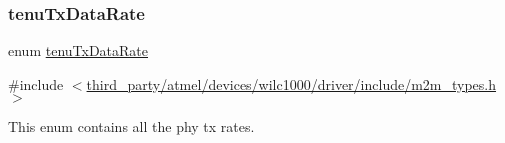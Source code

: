 \mbox{\label{group__WlanEnums_ga93cc7cca5e41a62c610de1e30ab38b96}} 
\subsubsection{\texorpdfstring{tenu\+Tx\+Data\+Rate}{tenuTxDataRate}}
{\footnotesize\ttfamily enum \hyperlink{group__WlanEnums_ga93cc7cca5e41a62c610de1e30ab38b96}{tenu\+Tx\+Data\+Rate}}



{\ttfamily \#include $<$\hyperlink{m2m__types_8h}{third\+\_\+party/atmel/devices/wilc1000/driver/include/m2m\+\_\+types.\+h}$>$}



This enum contains all the phy tx rates. 

